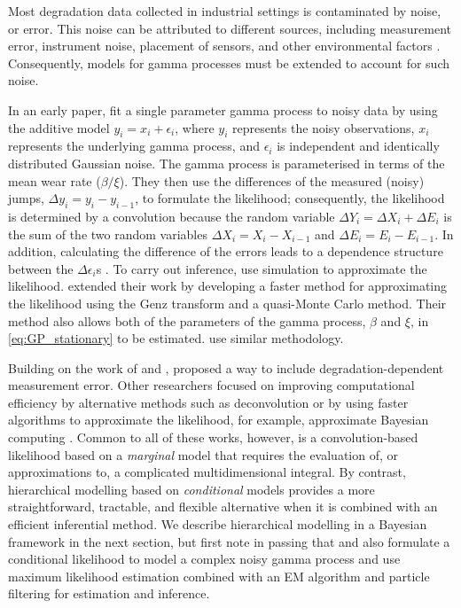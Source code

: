 \documentclass{article}
\begin{document}
Most degradation data collected in industrial settings is contaminated by noise, or error. This noise can be attributed to different sources, including measurement error, instrument noise, placement of sensors, and other environmental factors \citep{ye:2015}. Consequently, models for gamma processes must be extended to account for such noise. 

In an early paper, \citet{kallen_optimal_2005} fit a single parameter gamma process to noisy data by using the additive model $y_i = x_i + \epsilon_i$, where $y_i$ represents the noisy observations, $x_i$ represents the underlying gamma process, and $\epsilon_i$ is independent and identically distributed Gaussian noise. The gamma process is parameterised in terms of the mean wear rate ($\beta / \xi $). They then use the differences of the measured (noisy) jumps, $\Delta y_i = y_i - y_{i-1}$, to formulate the likelihood; consequently, the likelihood is determined by a convolution because the random variable $\Delta Y_i = \Delta X_i + \Delta E_i$ is the sum of the two random variables $\Delta X_i = X_i - X_{i-1}$ and $\Delta E_i = E_i - E_{i-1}$. In addition, calculating the difference of the errors leads to a dependence structure between the $\Delta \epsilon_i$s . To carry out inference, \citet{kallen_optimal_2005} use simulation to approximate the likelihood. \citet{lu_efficient_2013} extended their work by developing a faster method for approximating the likelihood using the Genz transform and a quasi-Monte Carlo method. Their method also allows both of the parameters of the gamma process, $\beta$ and $\xi$, in \eqref{eq:GP_stationary} to be estimated. \citet{peng_2018} use similar methodology.

Building on the work of \citet{kallen_optimal_2005} and \citet{lu_efficient_2013}, \citet{pulcini_perturbed_2016} proposed a way to include degradation-dependent measurement error. Other researchers focused on improving computational efficiency by alternative methods such as deconvolution \citep{rodriguez-picon_reliability_2021} or by using  faster algorithms to approximate the likelihood, for example, approximate Bayesian computing \citep{hazra_approximate_2020, hazra_likelihood-free_2022}. Common to all of these works, however, is a convolution-based likelihood based on a \emph{marginal} model that requires the evaluation of, or approximations to, a complicated multidimensional integral. By contrast, hierarchical modelling based on \emph{conditional} models provides a more straightforward, tractable, and flexible alternative when it is combined with an efficient inferential method. We describe hierarchical modelling in a Bayesian framework in the next section, but first note in passing that \citet{giorgio_perturbed_2019} and \citet{esposito_new_2022} also formulate a conditional likelihood to model a complex noisy gamma process and use maximum likelihood estimation combined with an EM algorithm and particle filtering for estimation and inference.
\end{document}
